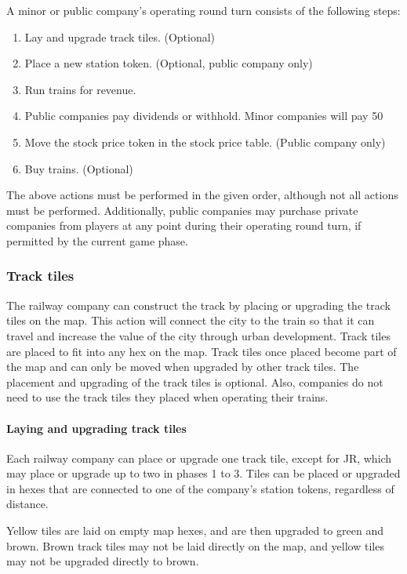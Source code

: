 \documentclass{article}
\begin{document}
\begin{CJK}{UTF8}{min}
\begin{multicols}{2}
A minor or public company's operating round turn consists of the following steps:

\begin{enumerate}
\item Lay and upgrade track tiles. (Optional)
\item Place a new station token. (Optional, public company only)
\item Run trains for revenue.
\item Public companies pay dividends or withhold. Minor companies will
  pay 50%
\item Move the stock price token in the stock price table. (Public company only)
\item Buy trains. (Optional)
\end{enumerate}

The above actions must be performed in the given order, although not
all actions must be performed. Additionally, public companies may
purchase private companies from players at any point during their
operating round turn, if permitted by the current game phase.

\subsubsection{Track tiles}
The railway company can construct the track by placing or upgrading
the track tiles on the map. This action will connect the city to the
train so that it can travel and increase the value of the city through
urban development. Track tiles are placed to fit into any hex on the
map. Track tiles once placed become part of the map and can only be
moved when upgraded by other track tiles. The placement and upgrading
of the track tiles is optional. Also, companies do not need to use the
track tiles they placed when operating their trains.

\paragraph{Laying and upgrading track tiles} \label{or-laying-tiles}
Each railway company can place or upgrade one track tile, except for
JR, which may place or upgrade up to two in phases 1 to 3. Tiles can
be placed or upgraded in hexes that are connected to one of the
company's station tokens, regardless of distance.

Yellow tiles are laid on empty map hexes, and are then upgraded to
green and brown. Brown track tiles may not be laid directly on the
map, and yellow tiles may not be upgraded directly to brown.


\end{multicols}
\end{CJK}
\end{document}
